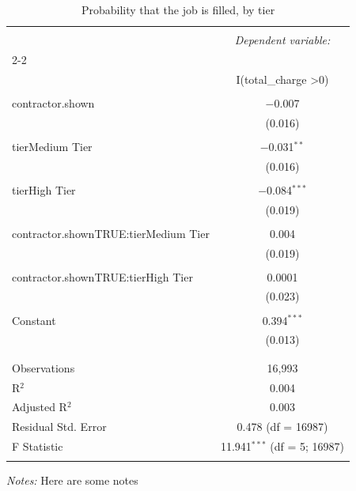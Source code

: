 
\begin{table}[!htbp] \centering 
  \caption{Probability that the job is filled, by tier} 
  \label{tab:fills_ambig} 
\begin{tabular}{@{\extracolsep{5pt}}lc} 
\\[-1.8ex]\hline 
\hline \\[-1.8ex] 
 & \multicolumn{1}{c}{\textit{Dependent variable:}} \\ 
\cline{2-2} 
\\[-1.8ex] & I(total\_charge \textgreater  0) \\ 
\hline \\[-1.8ex] 
 contractor.shown & $-$0.007 \\ 
  & (0.016) \\ 
  & \\ 
 tierMedium Tier & $-$0.031$^{**}$ \\ 
  & (0.016) \\ 
  & \\ 
 tierHigh Tier & $-$0.084$^{***}$ \\ 
  & (0.019) \\ 
  & \\ 
 contractor.shownTRUE:tierMedium Tier & 0.004 \\ 
  & (0.019) \\ 
  & \\ 
 contractor.shownTRUE:tierHigh Tier & 0.0001 \\ 
  & (0.023) \\ 
  & \\ 
 Constant & 0.394$^{***}$ \\ 
  & (0.013) \\ 
  & \\ 
\hline \\[-1.8ex] 
Observations & 16,993 \\ 
R$^{2}$ & 0.004 \\ 
Adjusted R$^{2}$ & 0.003 \\ 
Residual Std. Error & 0.478 (df = 16987) \\ 
F Statistic & 11.941$^{***}$ (df = 5; 16987) \\ 
\hline 
\hline \\[-1.8ex] 
\end{tabular}
\begin{minipage}{0.9\linewidth} 
 \emph{Notes:} Here are some notes
 \end{minipage}
\end{table}
